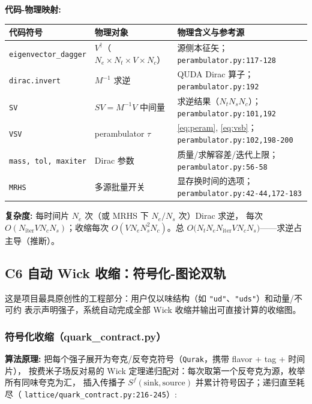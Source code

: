 \documentclass[UTF8]{ctexart}
\begin{document}
\begin{mapbox}
\textbf{代码-物理映射:}
\end{mapbox}
\begin{xltabular}{\textwidth}{llX}
\toprule
\textcolor{map}{代码符号} & 物理对象 & 物理含义与参考源 \\
\midrule
\endhead
\texttt{eigenvector\_dagger} & $V^\dagger$（$N_e\times N_t\times V\times N_c$） & 源侧本征矢；
  \texttt{\nolinkurl{perambulator.py:117-128}} \\
\texttt{dirac.invert} & $M^{-1}$ 求逆 & QUDA Dirac 算子；
  \texttt{\nolinkurl{perambulator.py:192}} \\
\texttt{SV} & $SV = M^{-1}V$ 中间量 & 求逆结果（$N_t N_s N_c$）；
  \texttt{\nolinkurl{perambulator.py:101,192}} \\
\texttt{VSV} & perambulator $\tau$ & \eqref{eq:peram}, \eqref{eq:vsb}；
  \texttt{\nolinkurl{perambulator.py:102,198-200}} \\
\texttt{mass, tol, maxiter} & Dirac 参数 & 质量/求解容差/迭代上限；
  \texttt{\nolinkurl{perambulator.py:56-58}} \\
\texttt{MRHS} & 多源批量开关 & 显存换时间的选项；
  \texttt{\nolinkurl{perambulator.py:42-44,172-183}} \\
\bottomrule
\end{xltabular}

\textbf{复杂度:} 每时间片 $N_e$ 次（或 MRHS 下 $N_e/N_s$ 次）Dirac 求逆，
每次 $O(N_{\text{iter}} V N_c N_s)$；收缩每次 $O(V N_e N_s^2 N_c)$。总
$O\big(N_t N_e N_{\text{iter}} V N_c N_s\big)$——求逆占主导（推断）。

\subsection{C6 自动 Wick 收缩：符号化-图论双轨}
\label{sec:c6}

这是项目最具原创性的工程部分：用户仅以味结构（如 \texttt{"ud"}、\texttt{"uds"}）和动量/不可约
表示声明强子，系统自动完成全部 Wick 收缩并输出可直接计算的收缩图。

\subsubsection{符号化收缩（quark\_contract.py）}
\textbf{算法原理:} 把每个强子展开为夸克/反夸克符号（\texttt{Qurak}，携带 flavor + tag + 时间片），
按费米子场反对易的 Wick 定理递归配对：每次取第一个反夸克为源，枚举所有同味夸克为汇，
插入传播子 $S^f(\text{sink}, \text{source})$ 并累计符号因子；递归直至耗尽（
\texttt{lattice/quark\_contract.py:216-245}）:

\end{document}
